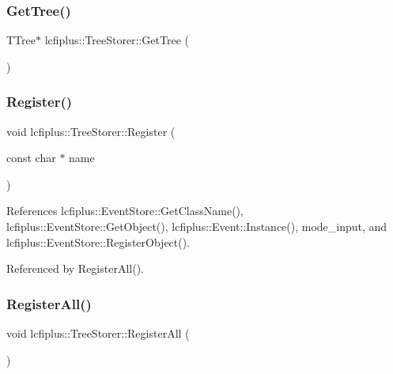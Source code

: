 \mbox{\label{classlcfiplus_1_1TreeStorer_a6615a109d5e0497e1d304f88a0e13376}} 
\subsubsection{Get\+Tree()}
{\footnotesize\ttfamily T\+Tree$\ast$ lcfiplus\+::\+Tree\+Storer\+::\+Get\+Tree (\begin{DoxyParamCaption}{ }\end{DoxyParamCaption})\hspace{0.3cm}{\ttfamily [inline]}}

\mbox{\label{classlcfiplus_1_1TreeStorer_ae328a07350a9db9e6ca58ddff15a31ef}} 
\subsubsection{Register()}
{\footnotesize\ttfamily void lcfiplus\+::\+Tree\+Storer\+::\+Register (\begin{DoxyParamCaption}\item[{const char $\ast$}]{name }\end{DoxyParamCaption})}



References lcfiplus\+::\+Event\+Store\+::\+Get\+Class\+Name(), lcfiplus\+::\+Event\+Store\+::\+Get\+Object(), lcfiplus\+::\+Event\+::\+Instance(), mode\+\_\+input, and lcfiplus\+::\+Event\+Store\+::\+Register\+Object().



Referenced by Register\+All().

\mbox{\label{classlcfiplus_1_1TreeStorer_ac5319b483048e6ee727859143655bec7}} 
\subsubsection{Register\+All()}
{\footnotesize\ttfamily void lcfiplus\+::\+Tree\+Storer\+::\+Register\+All (\begin{DoxyParamCaption}{ }\end{DoxyParamCaption})}



